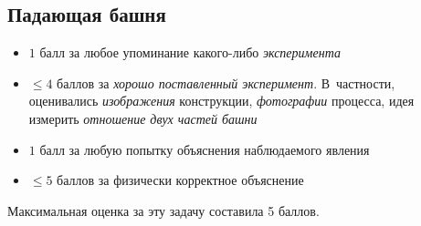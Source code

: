 \documentclass[10pt, a4paper, oneside, fleqn]{article}
\newcommand\т{~--- }
\def\le{\leqslant}
\newenvironment{items}
{\begin{itemize}%
\setlength{\itemsep}{-1pt}}
{\end{itemize}}
\begin{document}
\subsection{Падающая башня}

\begin{items}
\item $1$ балл за любое упоминание какого-либо \emph{эксперимента}
\item $\le 4$ баллов за \emph{хорошо поставленный эксперимент}.
В~частности, оценивались \emph{изображения} конструкции, \emph{фотографии} процесса,
идея измерить \emph{отношение двух частей башни}
\item $1$ балл за любую попытку объяснения наблюдаемого явления
\item $\le 5$ баллов за физически корректное объяснение
\end{items}
Максимальная оценка за эту задачу составила 5 баллов.
\end{document}
